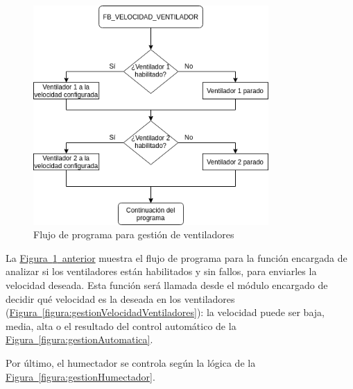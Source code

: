 \clearpage

\vspace*{\fill}

\begin{figure}[H]
    \centering
    \includegraphics[width=0.8\textwidth, keepaspectratio]{img/0-fbVelocidadVentilador}
    \caption{Flujo de programa para gestión de ventiladores}
    \label{figura:gestionVentiladores}
\end{figure}

   \vspace*{\fill}

La \hyperref[figura:gestionVentiladores]{Figura~\ref{figura:gestionVentiladores}~anterior} muestra el flujo de programa para la función encargada de analizar si los ventiladores están habilitados y sin fallos, para enviarles la velocidad deseada. Esta función será llamada desde el módulo encargado de decidir qué velocidad es la deseada en los ventiladores (\hyperref[figura:gestionVelocidadVentiladores]{Figura~\ref{figura:gestionVelocidadVentiladores}}): la velocidad puede ser baja, media, alta o el resultado del control automático de la \hyperref[figura:gestionAutomatica]{Figura~\ref{figura:gestionAutomatica}}. 

Por último, el humectador se controla según la lógica de la \hyperref[figura:gestionHumectador]{Figura~\ref{figura:gestionHumectador}}.

\clearpage 

   \vspace*{\fill}

